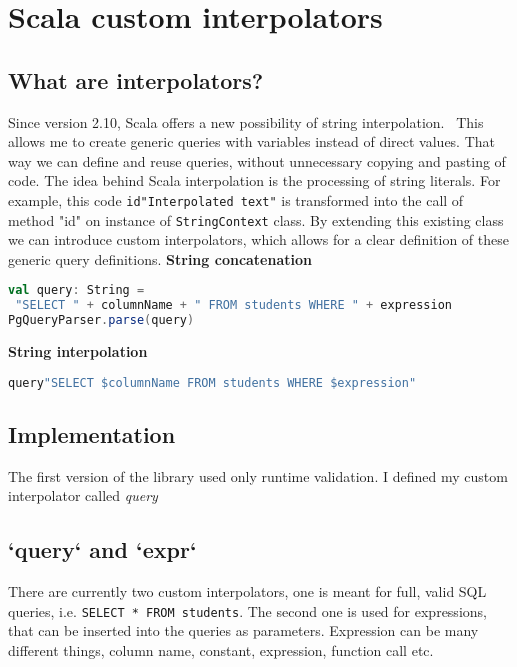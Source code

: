 \section{Scala custom interpolators}
\subsection{What are interpolators?}
Since version 2.10, Scala offers a new possibility of string interpolation.~\cite{String interpolation} This allows me to create generic queries with variables instead of direct values. That way we can define and reuse queries, without unnecessary copying and pasting of code. The idea behind Scala interpolation is the processing of string literals. For example, this code  \verb|id"Interpolated text"| is transformed into the call of method "id" on instance of \texttt{StringContext} class. By extending this existing class we can introduce custom interpolators, which allows for a clear definition of these generic query definitions.
\bigskip
\newline
\textbf{String concatenation}
\begin{lstlisting}[language=scala, basicstyle=\ttfamily, showstringspaces=false]
val query: String = 
 "SELECT " + columnName + " FROM students WHERE " + expression
PgQueryParser.parse(query)
\end{lstlisting}
\bigskip
\textbf{String interpolation}
\begin{lstlisting}[language=scala, basicstyle=\ttfamily, showstringspaces=false]
query"SELECT $columnName FROM students WHERE $expression"
\end{lstlisting}

\subsection{Implementation}
The first version of the library used only runtime validation. I defined my custom interpolator called \textit{query}

\subsection{`query` and `expr`}
There are currently two custom interpolators, one is meant for full, valid SQL queries, i.e. \texttt{SELECT * FROM students}. The second one is used for expressions, that can be inserted into the queries as parameters. Expression can be many different things, column name, constant, expression, function call etc.

